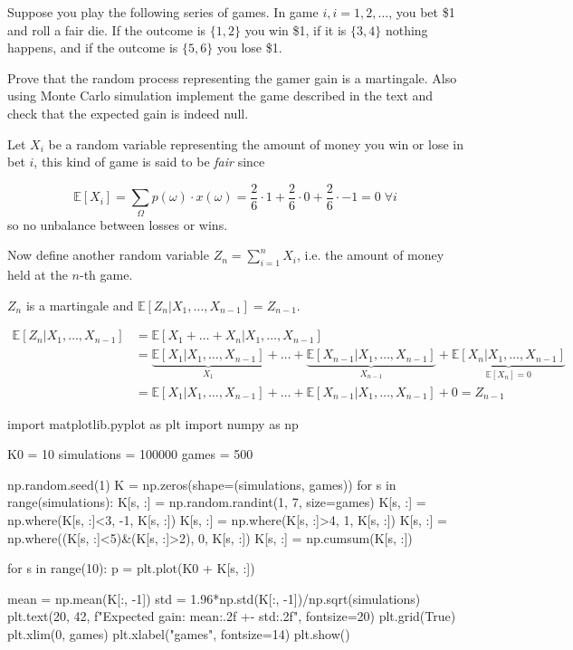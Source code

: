 \documentclass[12pt,a4paper]{book}
\begin{document}
\begin{exercise}[subtitle={Martingale Game}]
Suppose you play the following series of games. In game $i, i = 1, 2,\ldots$, you bet \$1 and roll a fair die. If the outcome is $\{1,2\}$ you win \$1, if it is $\{3,4\}$ nothing happens, and if the outcome is $\{5,6\}$ you lose \$1.

Prove that the random process representing the gamer gain is a martingale.
Also using Monte Carlo simulation implement the game described in the text and check that the expected gain is indeed null.
\end{exercise}
\begin{solution}
Let $X_i$ be a random variable representing the amount of money you win or lose in bet $i$, this kind of game is said to be \emph{fair} since

$$\mathbb{E}[X_i]= \sum_{\Omega}p(\omega)\cdot x(\omega) = \frac{2}{6}\cdot 1 + \frac{2}{6}\cdot 0 + \frac{2}{6}\cdot -1 = 0\;\forall i$$
so no unbalance between losses or wins.

Now define another random variable $Z_n = \sum_{i=1}^{n} X_i$, i.e. the amount of money held at the $n$-th game.

$Z_n$ is a martingale and $\mathbb{E}[Z_n|X_1,\ldots, X_{n-1}] = Z_{n-1}$.

\begin{equation*}
	\begin{aligned}
		\mathbb{E}[Z_n|X_1,\ldots, X_{n-1}] &= \mathbb{E}[X_1 +\ldots + X_n|X_1,\ldots, X_{n-1}] \\
		& = \underbrace{\mathbb{E}[X_1|X_1,\ldots, X_{n-1}]}_{X_1} + \ldots + \underbrace{\mathbb{E}[X_{n-1}|X_1,\ldots, X_{n-1}]}_{X_{n-1}} + \underbrace{\mathbb{E}[X_n|X_1,\ldots, X_{n-1}]}_{\mathbb{E}[X_n]=0} \\
		& = \mathbb{E}[X_1|X_1,\ldots, X_{n-1}] + \ldots + \mathbb{E}[X_{n-1}|X_1,\ldots, X_{n-1}] + 0 = Z_{n-1}
	\end{aligned}
\end{equation*}

\begin{ipython}
import matplotlib.pyplot as plt
import numpy as np

K0 = 10
simulations = 100000
games = 500

np.random.seed(1)
K = np.zeros(shape=(simulations, games))
for s in range(simulations):
    K[s, :] = np.random.randint(1, 7, size=games)
    K[s, :] = np.where(K[s, :]<3, -1, K[s, :])
    K[s, :] = np.where(K[s, :]>4, 1, K[s, :])
    K[s, :] = np.where((K[s, :]<5)&(K[s, :]>2), 0, K[s, :])
    K[s, :] = np.cumsum(K[s, :])

for s in range(10):
    p = plt.plot(K0 + K[s, :])

mean = np.mean(K[:, -1])
std = 1.96*np.std(K[:, -1])/np.sqrt(simulations)
plt.text(20, 42, f"Expected gain: {mean:.2f} +- {std:.2f}", fontsize=20)
plt.grid(True)
plt.xlim(0, games)
plt.xlabel("games", fontsize=14)
plt.show()
\end{ipython}
\end{solution}
\end{document}
